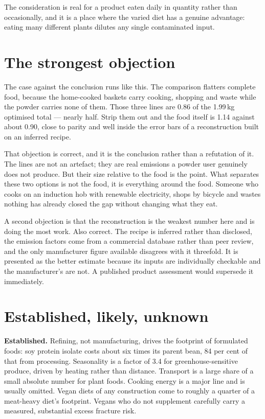 \documentclass[11pt,a4paper]{article}
\begin{document}
The consideration is real for a product eaten daily in quantity rather than
occasionally, and it is a place where the varied diet has a genuine advantage: eating
many different plants dilutes any single contaminated input.

\section{The strongest objection}

The case against the conclusion runs like this. The comparison flatters complete food,
because the home-cooked baskets carry cooking, shopping and waste while the powder
carries none of them. Those three lines are 0.86 of the 1.99\,kg optimised total —
nearly half. Strip them out and the food itself is 1.14 against about 0.90, close to
parity and well inside the error bars of a reconstruction built on an inferred recipe.

That objection is correct, and it is the conclusion rather than a refutation of it.
The lines are not an artefact; they are real emissions a powder user genuinely does
not produce. But their size relative to the food is the point. What separates these
two options is not the food, it is everything around the food. Someone who cooks on an
induction hob with renewable electricity, shops by bicycle and wastes nothing has
already closed the gap without changing what they eat.

A second objection is that the reconstruction is the weakest number here and is doing
the most work. Also correct. The recipe is inferred rather than disclosed, the emission
factors come from a commercial database rather than peer review, and the only
manufacturer figure available disagrees with it threefold. It is presented as the
better estimate because its inputs are individually checkable and the manufacturer's
are not. A published product assessment would supersede it immediately.

\section{Established, likely, unknown}

\textbf{Established.} Refining, not manufacturing, drives the footprint of formulated
foods: soy protein isolate costs about six times its parent bean, 84 per cent of that
from processing. Seasonality is a factor of 3.4 for greenhouse-sensitive produce,
driven by heating rather than distance. Transport is a large share of a small absolute
number for plant foods. Cooking energy is a major line and is usually omitted. Vegan
diets of any construction come to roughly a quarter of a meat-heavy diet's footprint.
Vegans who do not supplement carefully carry a measured, substantial excess fracture
risk.
\end{document}
